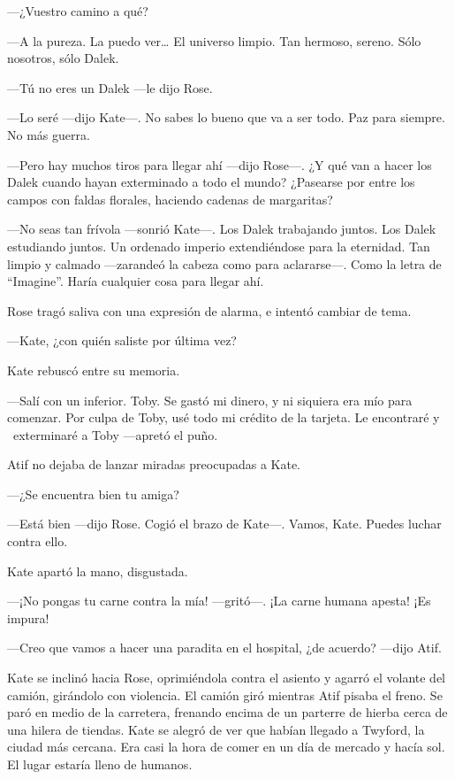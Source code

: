 ---¿Vuestro camino a qué?

---A la pureza. La puedo ver\ldots{} El universo limpio. Tan hermoso,
sereno. Sólo nosotros, sólo Dalek.

---Tú no eres un Dalek ---le dijo Rose.

---Lo seré ---dijo Kate---. No sabes lo bueno que va a ser todo. Paz para
siempre. No más guerra.

---Pero hay muchos tiros para llegar ahí ---dijo Rose---. ¿Y qué van a
hacer los Dalek cuando hayan exterminado a todo el mundo? ¿Pasearse por
entre los campos con faldas florales, haciendo cadenas de margaritas?

---No seas tan frívola ---sonrió Kate---. Los Dalek trabajando juntos. Los
Dalek estudiando juntos. Un ordenado imperio extendiéndose para la
eternidad. Tan limpio y calmado ---zarandeó la cabeza como para
aclararse---. Como la letra de ``Imagine''. Haría cualquier cosa para
llegar ahí.

Rose tragó saliva con una expresión de alarma, e intentó cambiar de
tema.

---Kate, ¿con quién saliste por última vez?

Kate rebuscó entre su memoria.

---Salí con un inferior. Toby. Se gastó mi dinero, y ni siquiera era mío
para comenzar. Por culpa de Toby, usé todo mi crédito de la tarjeta. Le
encontraré y ~exterminaré a Toby ---apretó el puño.

Atif no dejaba de lanzar miradas preocupadas a Kate.

---¿Se encuentra bien tu amiga?

---Está bien ---dijo Rose. Cogió el brazo de Kate---. Vamos, Kate. Puedes
luchar contra ello.

Kate apartó la mano, disgustada.

---¡No pongas tu carne contra la mía! ---gritó---. ¡La carne humana
apesta! ¡Es impura!

---Creo que vamos a hacer una paradita en el hospital, ¿de acuerdo?
---dijo Atif.

Kate se inclinó hacia Rose, oprimiéndola contra el asiento y agarró el
volante del camión, girándolo con violencia. El camión giró mientras
Atif pisaba el freno. Se paró en medio de la carretera, frenando encima
de un parterre de hierba cerca de una hilera de tiendas. Kate se alegró
de ver que habían llegado a Twyford, la ciudad más cercana. Era casi la
hora de comer en un día de mercado y hacía sol. El lugar estaría lleno
de humanos.

